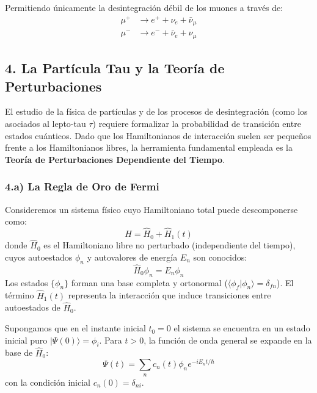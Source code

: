 Permitiendo únicamente la desintegración débil de los muones a través de:
\begin{align}
\mu^+ &\longrightarrow e^+ + \nu_e + \bar{\nu}_\mu \\
\mu^- &\longrightarrow e^- + \bar{\nu}_e + \nu_\mu
\end{align}

\newpage


\subsection{4. La Partícula Tau y la Teoría de Perturbaciones}

El estudio de la física de partículas y de los procesos de desintegración (como los asociados al lepto-tau $\tau$) requiere formalizar la probabilidad de transición entre estados cuánticos. Dado que los Hamiltonianos de interacción suelen ser pequeños frente a los Hamiltonianos libres, la herramienta fundamental empleada es la \textbf{Teoría de Perturbaciones Dependiente del Tiempo}.

\subsubsection{4.a) La Regla de Oro de Fermi}

Consideremos un sistema físico cuyo Hamiltoniano total puede descomponerse como:
\begin{equation}
\hat{H} = \hat{H}_0 + \hat{H}_1(t)
\end{equation}
donde $\hat{H}_0$ es el Hamiltoniano libre no perturbado (independiente del tiempo), cuyos autoestados $\phi_n$ y autovalores de energía $E_n$ son conocidos:
\begin{equation}
\hat{H}_0 \phi_n = E_n \phi_n
\end{equation}
Los estados $\{\phi_n\}$ forman una base completa y ortonormal ($\langle \phi_f | \phi_n \rangle = \delta_{fn}$). El término $\hat{H}_1(t)$ representa la interacción que induce transiciones entre autoestados de $\hat{H}_0$.

Supongamos que en el instante inicial $t_0 = 0$ el sistema se encuentra en un estado inicial puro $|\Psi(0)\rangle = \phi_i$. Para $t > 0$, la función de onda general se expande en la base de $\hat{H}_0$:
\begin{equation}
\Psi(t) = \sum_n c_n(t) \phi_n e^{-i E_n t / \hbar}
\end{equation}
con la condición inicial $c_n(0) = \delta_{ni}$.

